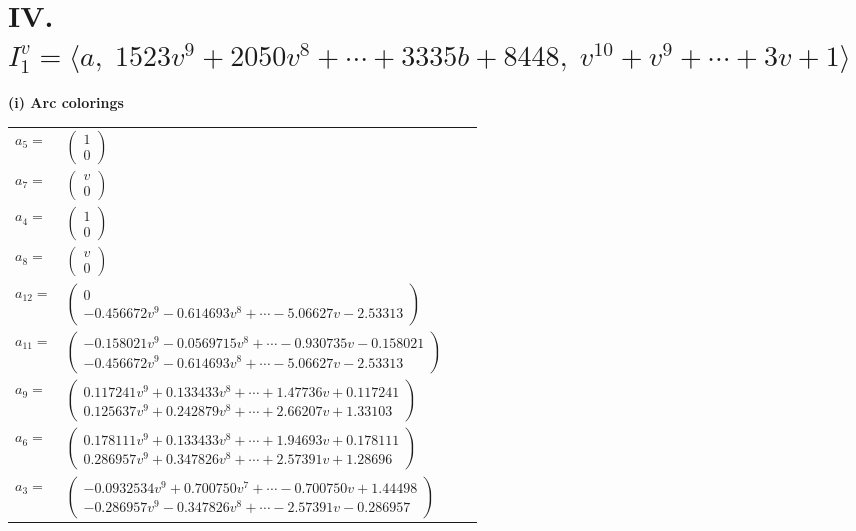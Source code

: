 \documentclass[1p]{elsarticle_modified}
\theoremstyle{definition}
\begin{document}
\centering \section*{IV. $I^v_{1}= \langle a,\;1523 v^9+2050 v^8+\cdots+3335 b+8448,\;v^{10}+v^9+\cdots+3 v+1 \rangle$}
\flushleft \textbf{(i) Arc colorings}\\
\begin{tabular}{m{7pt} m{180pt} m{7pt} m{180pt} }
\flushright $a_{5}=$&$\begin{pmatrix}1\\0\end{pmatrix}$ \\
\flushright $a_{7}=$&$\begin{pmatrix}v\\0\end{pmatrix}$ \\
\flushright $a_{4}=$&$\begin{pmatrix}1\\0\end{pmatrix}$ \\
\flushright $a_{8}=$&$\begin{pmatrix}v\\0\end{pmatrix}$ \\
\flushright $a_{12}=$&$\begin{pmatrix}0\\-0.456672 v^{9}-0.614693 v^{8}+\cdots-5.06627 v-2.53313\end{pmatrix}$ \\
\flushright $a_{11}=$&$\begin{pmatrix}-0.158021 v^{9}-0.0569715 v^{8}+\cdots-0.930735 v-0.158021\\-0.456672 v^{9}-0.614693 v^{8}+\cdots-5.06627 v-2.53313\end{pmatrix}$ \\
\flushright $a_{9}=$&$\begin{pmatrix}0.117241 v^{9}+0.133433 v^{8}+\cdots+1.47736 v+0.117241\\0.125637 v^{9}+0.242879 v^{8}+\cdots+2.66207 v+1.33103\end{pmatrix}$ \\
\flushright $a_{6}=$&$\begin{pmatrix}0.178111 v^{9}+0.133433 v^{8}+\cdots+1.94693 v+0.178111\\0.286957 v^{9}+0.347826 v^{8}+\cdots+2.57391 v+1.28696\end{pmatrix}$ \\
\flushright $a_{3}=$&$\begin{pmatrix}-0.0932534 v^{9}+0.700750 v^{7}+\cdots-0.700750 v+1.44498\\-0.286957 v^{9}-0.347826 v^{8}+\cdots-2.57391 v-0.286957\end{pmatrix}$ \\

\end{tabular}
\end{document}
